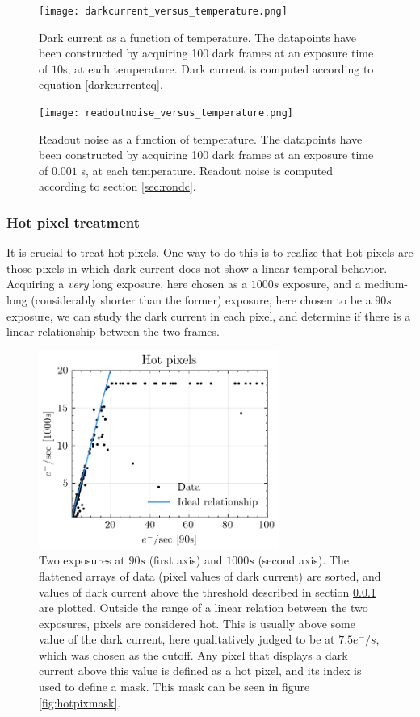 \documentclass[../main.tex]{subfiles}
\begin{document}
		\begin{figure}
			\centering			\texttt{[image: darkcurrent\_versus\_temperature.png]}
			\caption{Dark current as a function of temperature. The datapoints have been constructed by acquiring 100 dark frames at an exposure time of $10$s, at each temperature. Dark current is computed according to equation \ref{darkcurrenteq}. }
			\label{fig:darkcurrent}
		\end{figure}
	\begin{figure}
		\centering			\texttt{[image: readoutnoise\_versus\_temperature.png]}
		\caption{Readout noise as a function of temperature. The datapoints have been constructed by acquiring 100 dark frames at an exposure time of $0.001$ s, at each temperature. Readout noise is computed according to section \ref{sec:rondc}. }
		\label{fig:readoutnoise}
	\end{figure}
		
		\subsubsection{Hot pixel treatment}\label{sect:hotpix}
		It is crucial to treat hot pixels. One way to do this is to realize that hot pixels are those pixels in which dark current does not show a linear temporal behavior. Acquiring a \textit{very} long exposure, here chosen as a $1000s$ exposure, and a medium-long (considerably shorter than the former) exposure, here chosen to be a $90s$ exposure, we can study the dark current in each pixel, and determine if there is a linear relationship between the two frames. 
		
		\begin{figure}
			\centering			\includegraphics[width=0.7\textwidth]{hot_pixels_test.png}
			\caption{Two exposures at $90s$ (first axis) and $1000s$ (second axis). The flattened arrays of data (pixel values of dark current) are sorted, and values of dark current above the threshold described in section \ref{sect:hotpix} are plotted. Outside the range of a linear relation between the two exposures, pixels are considered hot. This is usually above some value of the dark current, here qualitatively judged to be at $7.5 e^-/s$, which was chosen as the cutoff. Any pixel that displays a dark current above this value is defined as a hot pixel, and its index is used to define a mask. This mask can be seen in figure \ref{fig:hotpixmask}.
			}
			\label{fig:hotpix}
		\end{figure}
		
\end{document}
